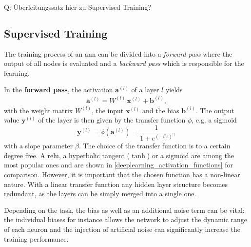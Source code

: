 Q: Überleitungssatz hier zu Supervised Training?



\subsection{Supervised Training}
\label{supervisedtraining}
The training process of an \gls{ann} can be divided into a \emph{forward pass} where the output of all nodes is evaluated and a \emph{backward pass} which is responsible for the learning.

In the \textbf{forward pass}, the activation $\mathbf{a}^{(l)}$ of a layer $l$ yields
\begin{align}
\label{activation}
\mathbf{a}^{(l)} = W^{(l)} \, \mathbf{x}^{(l)} + \mathbf{b}^{(l)},
\end{align}
with the weight matrix $W^{(l)}$, the input $\mathbf{x}^{(l)}$ and the bias $\mathbf{b}^{(l)}$. The output value $\mathbf{y}^{(l)}$ of the layer is then given by the transfer function $\phi$, e.g. a sigmoid
\begin{equation}
\label{transferANN}
\mathbf{y}^{(l)} = \phi(\mathbf{a}^{(l)}) = \frac{1}{1 + e^{(-\beta x)}},
\end{equation}
with a slope parameter $\beta$. The choice of the transfer function is to a certain degree free. A \gls{relu}, a hyperbolic tangent ($\tanh$) or a sigmoid are among the most popular ones and are shown in \cref{deeplearning_activation_functions} for comparison.
However, it is important that the chosen function has a non-linear nature. With a linear transfer function any hidden layer structure becomes redundant, as the layers can be simply merged into a single one.

Depending on the task, the bias as well as an additional noise term can be vital: the individual biases for instance allows the network to adjust the dynamic range of each neuron and the injection of artificial noise can significantly increase the training performance. 

